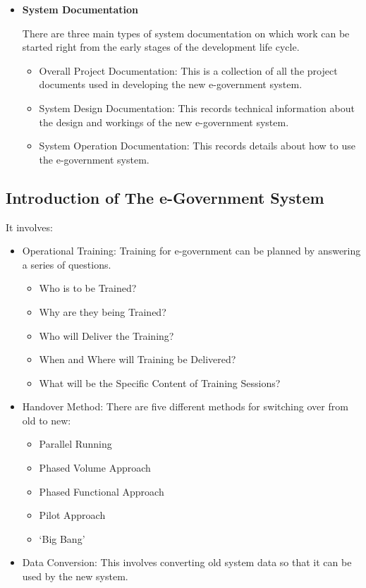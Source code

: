 \begin{itemize}
\item \textbf{System Documentation}

There are three main types of system documentation on which work can be started
right from the early stages of the development life cycle.

\begin{itemize}
	\item Overall Project Documentation: This is a collection of all the project
	documents used in developing the new
	e-government system.
	\item System Design Documentation: This records technical information about
	the design and workings of the new
	e-government system.
	\item System Operation Documentation: This records details about how to use the
	e-government system.
\end{itemize}
\end{itemize}

\subsection{Introduction of The e-Government System}
It involves:
\begin{itemize}
	\item Operational Training: Training for e-government can be planned
	by answering a series of questions.
	\begin{itemize}
		\item Who is to be Trained?
		\item Why are they being Trained?
		\item Who will Deliver the Training?
		\item When and Where will Training
		be Delivered?
		\item What will be the Specific Content
		of Training Sessions?
	\end{itemize}
	\item Handover Method: There are five different methods for
	switching over from old to new:
	\begin{itemize}
		\item Parallel Running
		\item Phased Volume Approach
		\item Phased Functional Approach
		\item Pilot Approach
		\item `Big Bang'
	\end{itemize}
	
	
	\item Data Conversion: This involves converting old system data so
	that it can be used by the new system.
\end{itemize}



